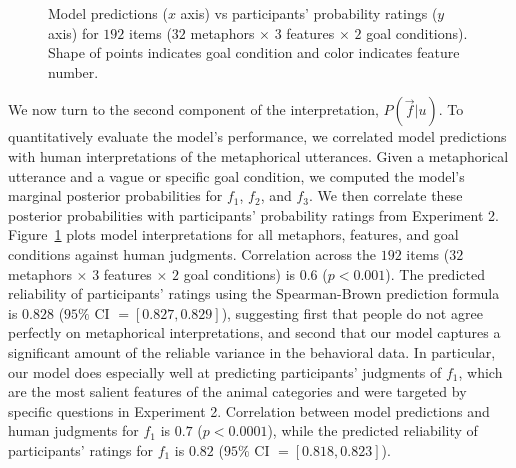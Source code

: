 \documentclass[10pt,letterpaper]{article}
\begin{document}
\begin{figure}[t]
\begin{center}
\end{center}
\caption{Model predictions ($x$ axis) vs participants' probability ratings ($y$ axis) for $192$ items ($32$ metaphors $\times$ $3$ features $\times$ $2$ goal conditions). Shape of points indicates goal condition and color indicates feature number.} 
\label{scatter_full}
\end{figure}

We now turn to the second component of the interpretation, $P(\vec f | u)$. 
To quantitatively evaluate the model's performance, we correlated model predictions with human interpretations of the metaphorical utterances. Given a metaphorical utterance and a vague or specific goal condition, we computed the model's marginal posterior probabilities for $f_1$, $f_2$, and $f_3$. We then correlate these posterior probabilities with participants' probability ratings from Experiment 2. Figure~\ref{scatter_full} plots model interpretations for all metaphors, features, and goal conditions against human judgments. Correlation across the $192$ items ($32$ metaphors $\times$ $3$ features $\times$ $2$ goal conditions) is $0.6$ ($p < 0.001$). The predicted reliability of participants' ratings using the Spearman-Brown prediction formula is $0.828$ ($95\%$ CI $=[0.827, 0.829]$), suggesting first that people do not agree perfectly on metaphorical interpretations, and second that our model captures a significant amount of the reliable variance in the behavioral data. In particular, our model does especially well at predicting participants' judgments of $f_1$, which are the most salient features of the animal categories and were targeted by specific questions in Experiment 2. Correlation between model predictions and human judgments for $f_1$ is $0.7$ ($p < 0.0001$), while the predicted reliability of participants' ratings for $f_1$ is $0.82$ ($95\%$ CI $=[0.818, 0.823]$). 
\end{document}
